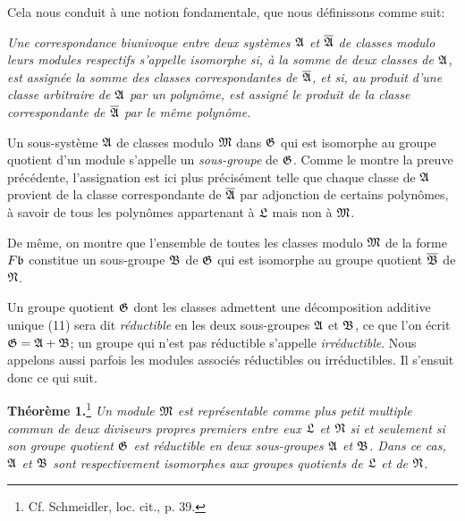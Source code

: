 Cela nous conduit à une notion fondamentale, que nous définissons comme suit:

\emph{Une correspondance biunivoque entre deux systèmes $\mathfrak{A}$ et $\overline{\mathfrak A}$ de classes modulo leurs modules respectifs s'appelle isomorphe si, à la somme de deux classes de $\mathfrak{A}$, est assignée la somme des classes correspondantes de $\overline{\mathfrak A}$, et si, au produit d'une classe arbitraire de $\mathfrak{A}$ par un polynôme, est assigné le produit de la classe correspondante de $\overline{\mathfrak A}$ par le même polynôme.}

Un sous-système $\mathfrak{A}$ de classes modulo $\mathfrak{M}$ dans $\mathfrak{G}$ qui est isomorphe au groupe quotient d'un module s'appelle un \emph{sous-groupe} de $\mathfrak{G}$. Comme le montre la preuve précédente, l'assignation est ici plus précisément telle que chaque classe de $\mathfrak{A}$ provient de la classe correspondante de $\overline{\mathfrak A}$ par adjonction de certains polynômes, à savoir de tous les polynômes appartenant à $\mathfrak{L}$ mais non à $\mathfrak{M}$.

De même, on montre que l'ensemble de toutes les classes modulo $\mathfrak{M}$ de la forme $F\mathfrak{b}$ constitue un sous-groupe $\mathfrak{B}$ de $\mathfrak{G}$ qui est isomorphe au groupe quotient $\overline{\mathfrak{B}}$ de $\mathfrak{N}$.

Un groupe quotient $\mathfrak{G}$ dont les classes admettent une décomposition additive unique (11) sera dit \emph{réductible} en les deux sous-groupes $\mathfrak{A}$ et $\mathfrak{B}$, ce que l'on écrit $\mathfrak{G}=\mathfrak{A}+\mathfrak{B}$; un groupe qui n'est pas réductible s'appelle \emph{irréductible}. Nous appelons aussi parfois les modules associés réductibles ou irréductibles. Il s'ensuit donc ce qui suit.

\textbf{Théorème 1.}\footnote{Cf. Schmeidler, loc. cit., p. 39.} \emph{Un module $\mathfrak{M}$ est représentable comme plus petit multiple commun de deux diviseurs propres premiers entre eux $\mathfrak{L}$ et $\mathfrak{N}$ si et seulement si son groupe quotient $\mathfrak{G}$ est réductible en deux sous-groupes $\mathfrak{A}$ et $\mathfrak{B}$. Dans ce cas, $\mathfrak{A}$ et $\mathfrak{B}$ sont respectivement isomorphes aux groupes quotients de $\mathfrak{L}$ et de $\mathfrak{N}$.}
